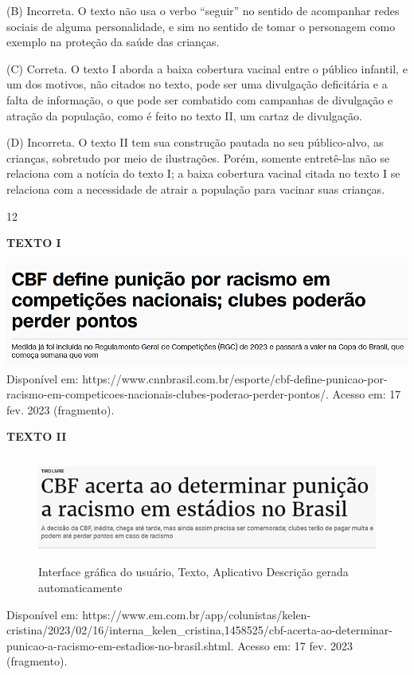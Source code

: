 (B) Incorreta. O texto não usa o verbo ``seguir'' no sentido de
acompanhar redes sociais de alguma personalidade, e sim no sentido de
tomar o personagem como exemplo na proteção da saúde das crianças.

(C) Correta. O texto I aborda a baixa cobertura vacinal entre o público
infantil, e um dos motivos, não citados no texto, pode ser uma
divulgação deficitária e a falta de informação, o que pode ser combatido
com campanhas de divulgação e atração da população, como é feito no
texto II, um cartaz de divulgação.

(D) Incorreta. O texto II tem sua construção pautada no seu
público-alvo, as crianças, sobretudo por meio de ilustrações. Porém,
somente entretê-las não se relaciona com a notícia do texto I; a baixa
cobertura vacinal citada no texto I se relaciona com a necessidade de
atrair a população para vacinar suas crianças.

\num{12}

\textbf{TEXTO I}

\includegraphics[width=5.34306in,height=1.37786in]{./imgSAEB_8_POR/media/image33.png}Disponível
em:
https://www.cnnbrasil.com.br/esporte/cbf-define-punicao-por-racismo-em-competicoes-nacionais-clubes-poderao-perder-pontos/.
Acesso em: 17 fev. 2023 (fragmento).

\textbf{TEXTO II}

\begin{figure}
\centering
\includegraphics[width=5.47847in,height=1.37348in]{./imgSAEB_8_POR/media/image34.png}
\caption{Interface gráfica do usuário, Texto, Aplicativo Descrição
gerada automaticamente}
\end{figure}

Disponível em:
https://www.em.com.br/app/colunistas/kelen-cristina/2023/02/16/interna\_kelen\_cristina,1458525/cbf-acerta-ao-determinar-punicao-a-racismo-em-estadios-no-brasil.shtml.
Acesso em: 17 fev. 2023 (fragmento).

